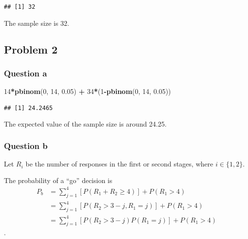 \documentclass[]{article}
\newenvironment{Shaded}{\begin{snugshade}}{\end{snugshade}}
\newcommand{\DecValTok}[1]{\textcolor[rgb]{0.00,0.00,0.81}{#1}}
\newcommand{\FloatTok}[1]{\textcolor[rgb]{0.00,0.00,0.81}{#1}}
\newcommand{\KeywordTok}[1]{\textcolor[rgb]{0.13,0.29,0.53}{\textbf{#1}}}
\newcommand{\NormalTok}[1]{#1}
\newcommand{\OperatorTok}[1]{\textcolor[rgb]{0.81,0.36,0.00}{\textbf{#1}}}
\newcommand{\StringTok}[1]{\textcolor[rgb]{0.31,0.60,0.02}{#1}}
\begin{document}
\begin{verbatim}
## [1] 32
\end{verbatim}

The sample size is 32.

\hypertarget{problem-2}{%
\subsection{Problem 2}\label{problem-2}}

\hypertarget{question-a-1}{%
\subsubsection{Question a}\label{question-a-1}}

\begin{Shaded}
\begin{Highlighting}[]
\DecValTok{14}\OperatorTok{*}\KeywordTok{pbinom}\NormalTok{(}\DecValTok{0}\NormalTok{, }\DecValTok{14}\NormalTok{, }\FloatTok{0.05}\NormalTok{) }\OperatorTok{+}\StringTok{ }\DecValTok{34}\OperatorTok{*}\NormalTok{(}\DecValTok{1}\OperatorTok{-}\KeywordTok{pbinom}\NormalTok{(}\DecValTok{0}\NormalTok{, }\DecValTok{14}\NormalTok{, }\FloatTok{0.05}\NormalTok{))}
\end{Highlighting}
\end{Shaded}

\begin{verbatim}
## [1] 24.2465
\end{verbatim}

The expected value of the sample size is around 24.25.

\hypertarget{question-b-1}{%
\subsubsection{Question b}\label{question-b-1}}

Let \(R_i\) be the number of responses in the first or second stages,
where \(i \in\{1,2\}\).

The probability of a ``go'' decision is \[\begin{split}
P_b&=\sum_{j=1}^4[P(R_1+R_2\geq4)]+P(R_1>4) \\
&=\sum_{j=1}^4[P(R_2>3-j,R_1=j)]+P(R_1>4) \\
&=\sum_{j=1}^4[P(R_2>3-j)P(R_1=j)]+P(R_1>4)
\end{split}\].
\end{document}
